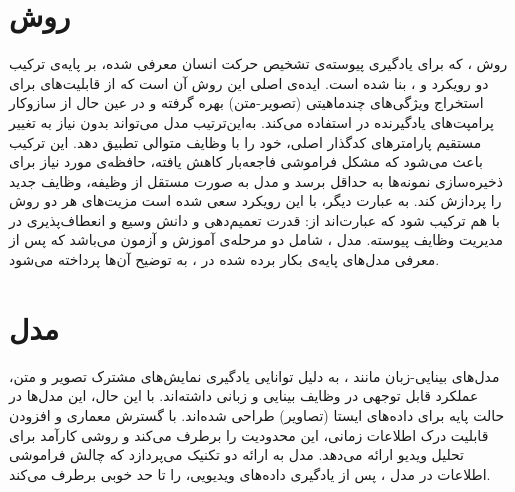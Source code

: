 \section{روش }
روش
،
که برای یادگیری پیوسته‌ی تشخیص حرکت انسان معرفی شده، بر پایه‌ی ترکیب دو رویکرد
و
،
بنا شده است. ایده‌ی اصلی این روش آن است که از قابلیت‌های  برای استخراج ویژگی‌های چندماهیتی (تصویر-متن) بهره گرفته و در عین حال از سازوکار پرامپت‌های یادگیرنده در  استفاده می‌کند. به‌این‌ترتیب مدل می‌تواند بدون نیاز به تغییر مستقیم پارامتر‌های کدگذار اصلی، خود را با وظایف متوالی تطبیق دهد. این ترکیب باعث می‌شود که مشکل فراموشی فاجعه‌بار کاهش یافته، حافظه‌ی مورد نیاز برای ذخیره‌سازی نمونه‌ها به حداقل برسد و مدل به صورت مستقل از وظیفه، وظایف جدید را پردازش کند. به عبارت دیگر، با این رویکرد سعی شده است مزیت‌های هر دو روش با هم ترکیب شود که عبارت‌اند از: قدرت تعمیم‌دهی و دانش وسیع  و انعطاف‌پذیری  در مدیریت وظایف پیوسته. مدل ، شامل دو مرحله‌‌ی آموزش  و آزمون می‌باشد که پس از معرفی مدل‌های پایه‌‌ی بکار برده شده در
،
به توضیح آن‌ها پرداخته می‌شود.

\section{مدل }
مدل‌های بینایی-زبان مانند ، به دلیل توانایی یادگیری نمایش‌های مشترک تصویر و متن، عملکرد قابل توجهی در وظایف بینایی و زبانی داشته‌اند. با این حال، این مدل‌ها در حالت پایه برای داده‌های ایستا (تصاویر) طراحی شده‌اند.  با گسترش معماری  و افزودن قابلیت درک اطلاعات زمانی، این محدودیت را برطرف می‌کند و روشی کارآمد برای تحلیل ویدیو ارائه می‌دهد. 
مدل 
به ارائه دو تکنیک می‌پردازد که چالش فراموشی اطلاعات در مدل
،
پس از یادگیری داده‌های ویدیویی، را تا حد خوبی برطرف می‌کند.

